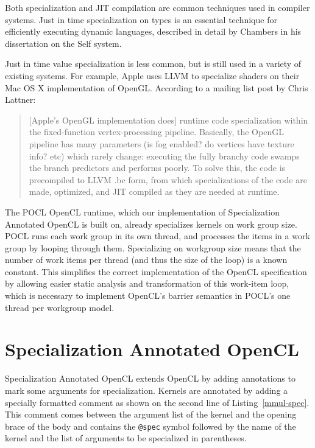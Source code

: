 \documentclass{acm_proc_article-sp}
\begin{document}
Both specialization and JIT compilation are common techniques used in compiler
systems. Just in time specialization on types is an essential technique for
efficiently executing dynamic languages, described in detail by Chambers in
his dissertation on the Self\cite{Chambers:1992:Self} system.

Just in time value specialization is less common, but is still used in a
variety of existing systems. For example, Apple uses LLVM to specialize shaders
on their Mac OS X implementation of OpenGL. According to a mailing list post by
Chris Lattner\cite{Apple:OpenGL:Spec}:

\begin{quote}
[Apple's OpenGL implementation does] runtime code specialization within the
fixed-function vertex-processing pipeline. Basically, the OpenGL pipeline has
many parameters (is fog enabled?  do vertices have texture info? etc) which
rarely change: executing the fully branchy code swamps the branch predictors
and performs poorly. To solve this, the code is precompiled to LLVM .bc form,
from which specializations of the code are made, optimized, and JIT compiled as
they are needed at runtime.
\end{quote}

The POCL OpenCL runtime, which our implementation of Specialization Annotated
OpenCL is built on, already specializes kernels on work group
size\cite{POCL:Codegen}. POCL runs each work group in its own thread, and
processes the items in a work group by looping through them. Specializing on
workgroup size means that the number of work items per thread (and thus the
size of the loop) is a known constant. This simplifies the correct
implementation of the OpenCL specification by allowing easier static analysis
and transformation of this work-item loop, which is necessary to implement
OpenCL's barrier semantics in POCL's one thread per workgroup model.

\section{Specialization Annotated OpenCL}

Specialization Annotated OpenCL extends OpenCL by adding annotations to mark
some arguments for specialization. Kernels are annotated by adding a specially
formatted comment as shown on the second line of Listing~\ref{mmul-spec}. This
comment comes between the argument list of the kernel and the opening brace of
the body and contains the {\tt @spec} symbol followed by the name of the kernel
and the list of arguments to be specialized in parentheses.
\end{document}
